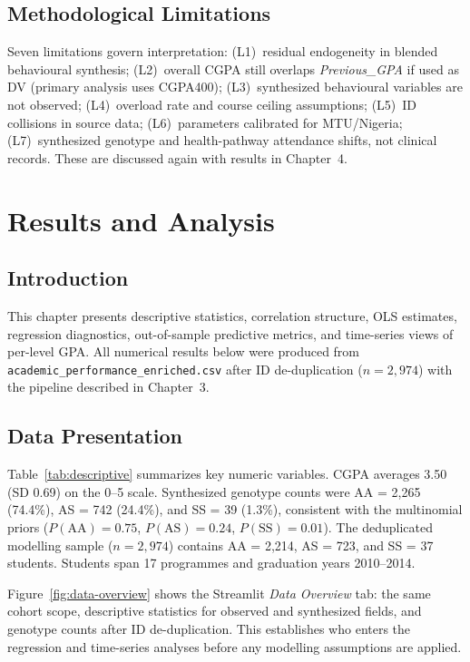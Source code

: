 \documentclass[12pt]{report}
\begin{document}
	\section{Methodological Limitations}
	\label{sec:method-limitations}
	Seven limitations govern interpretation: (L1)~residual endogeneity in blended behavioural synthesis; (L2)~overall CGPA still overlaps \textit{Previous\_GPA} if used as DV (primary analysis uses CGPA400); (L3)~synthesized behavioural variables are not observed; (L4)~overload rate and course ceiling assumptions; (L5)~ID collisions in source data; (L6)~parameters calibrated for MTU/Nigeria; (L7)~synthesized genotype and health-pathway attendance shifts, not clinical records. These are discussed again with results in Chapter~4.
	
	\chapter{Results and Analysis}
	
	\section{Introduction}
	This chapter presents descriptive statistics, correlation structure, OLS estimates, regression diagnostics, out-of-sample predictive metrics, and time-series views of per-level GPA. All numerical results below were produced from \texttt{academic\_performance\_enriched.csv} after ID de-duplication ($n = 2{,}974$) with the pipeline described in Chapter~3.
	
	\section{Data Presentation}
	Table~\ref{tab:descriptive} summarizes key numeric variables. CGPA averages 3.50 (SD 0.69) on the 0--5 scale. Synthesized genotype counts were AA = 2,265 (74.4\%), AS = 742 (24.4\%), and SS = 39 (1.3\%), consistent with the multinomial priors ($P(\text{AA})=0.75$, $P(\text{AS})=0.24$, $P(\text{SS})=0.01$). The deduplicated modelling sample ($n = 2{,}974$) contains AA = 2,214, AS = 723, and SS = 37 students. Students span 17 programmes and graduation years 2010--2014.
	
	Figure~\ref{fig:data-overview} shows the Streamlit \emph{Data Overview} tab: the same cohort scope, descriptive statistics for observed and synthesized fields, and genotype counts after ID de-duplication. This establishes who enters the regression and time-series analyses before any modelling assumptions are applied.
	
\end{document}
